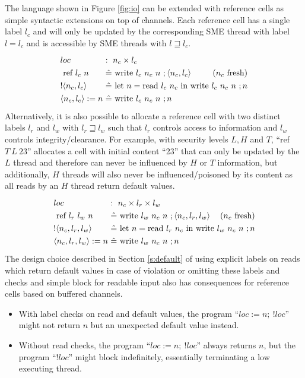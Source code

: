 \documentclass[10pt,preprint]{sigplanconf}
\newcommand{\arrayStretch}{1.28}
\renewcommand{\t}[1]{~\text{#1}~}
\begin{document}
The language shown in Figure \ref{fig:io} can be extended with reference cells as simple syntactic extensions on top of channels.  Each reference cell has a single label $l_c$ and will only be updated by the corresponding SME thread with label $l = l_c$ and is accessible by SME threads with $l \sqsupseteq l_c$.
\[\arraycolsep=1.6pt\def\arraystretch{\arrayStretch}
\begin{array}{ll}
  loc & :~n_c \times l_c \\
  \t{ref} l_c~n & \hat{=} \t{write} l_c~n_c~n~; \langle n_c, l_c \rangle \hfill (n_c~\text{fresh})  \\
  ! \langle n_c, l_c \rangle & \hat{=} \t{let} n = \text{read}~l_c~n_c \t{in} \text{write}~l_c~n_c~n~; n \\
  \langle n_c, l_c \rangle :=  n & \hat{=} \t{write} l_c~n_c~n~; n
\end{array} \]
Alternatively, it is also possible to allocate a reference cell with two distinct labels $l_r$ and $l_w$ with $l_r \sqsupseteq l_w$ such that $l_r$ controls access to information and $l_w$ controls integrity/clearance.  For example, with security levels $L, H$ and $T$, ``ref $T~L~23$'' allocates a cell with initial content ``23'' that can only be updated by the $L$ thread and therefore can never be influenced by $H$ or $T$ information, but additionally, $H$ threads will also never be influenced/poisoned by its content as all reads by an $H$ thread return default values.
\[\arraycolsep=1.6pt\def\arraystretch{\arrayStretch}
\begin{array}{ll}
  loc & :~n_c \times l_r \times l_w \\
  \t{ref} l_r~l_w~n & \hat{=} \t{write} l_w~n_c~n~; \langle n_c, l_r, l_w \rangle \hfill (n_c~\text{fresh})  \\
  ! \langle n_c, l_r, l_w \rangle & \hat{=} \t{let} n = \text{read}~l_r~n_c \t{in} \text{write}~l_w~n_c~n~; n \\
  \langle n_c, l_r, l_w \rangle :=  n & \hat{=} \t{write} l_w~n_c~n~; n
\end{array} \]
The design choice described in Section \ref{s:default} of using explicit labels on reads which return default values in case of violation or omitting these labels and checks and simple block for readable input also has consequences for reference cells based on buffered channels.

\begin{itemize}
  \item With label checks on read and default values, the program ``$loc := n ;~!loc$'' might not return $n$ but an unexpected default value instead.
  \item Without read checks, the program ``$loc := n ;~!loc$'' always returns $n$, but the program ``$!loc$'' might block indefinitely, essentially terminating a low executing thread.
\end{itemize}
\end{document}

